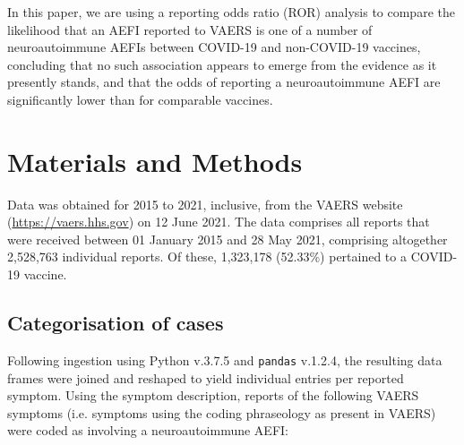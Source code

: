 \documentclass[idr,communication,submit,oneauthor,pdftex]{Definitions/mdpi}
\begin{document}
In this paper, we are using a reporting odds ratio (ROR) analysis\cite{rothman2004reporting} to compare the likelihood
that an AEFI reported to VAERS is one of a number of neuroautoimmune AEFIs between COVID-19 and non-COVID-19 vaccines,
concluding that no such association appears to emerge from the evidence as it presently stands, and that the odds of
reporting a neuroautoimmune AEFI are significantly lower than for comparable vaccines.

\section{Materials and Methods}

Data was obtained for 2015 to 2021, inclusive, from the VAERS website (\url{https://vaers.hhs.gov}) on 12 June 2021.
The data comprises all reports that were received between 01 January 2015 and 28 May 2021, comprising altogether
2,528,763 individual reports. Of these, 1,323,178 (52.33\%) pertained to a COVID-19 vaccine.

\subsection{Categorisation of cases}

Following ingestion using Python v.3.7.5 and \texttt{pandas} v.1.2.4,\cite{mckinney2011pandas} the resulting data
frames were joined and reshaped to yield individual entries per reported symptom. Using the symptom description,
reports of the following VAERS symptoms (i.e. symptoms using the coding phraseology as present in VAERS) were coded as
involving a neuroautoimmune AEFI:
\end{document}
